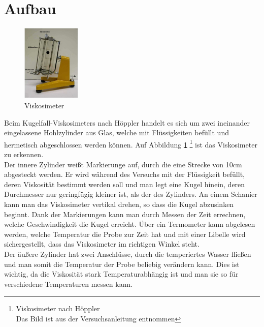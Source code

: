 	\section{Aufbau}
\begin{figure}
	\includegraphics[width=0.25\textwidth]{pics/aufbau.jpg}
	\caption{Viskosimeter}
	\label{aufbau}
\end{figure}
Beim Kugelfall-Viskosimeters nach Höppler handelt es sich um zwei ineinander eingelassene Hohlzylinder aus Glas, welche mit Flüssigkeiten befüllt und hermetisch abgeschlossen werden können. Auf Abbildung \ref{aufbau} \footnote{Viskosimeter nach Höppler\\Das Bild ist aus der Versuchsanleitung entnommen} ist das Viskosimeter zu erkennen.\\
Der innere Zylinder weißt Markierunge auf, durch die eine Strecke von 10cm abgesteckt werden. Er wird während des Versuchs mit der Flüssigkeit befüllt, deren Viskosität bestimmt werden soll und man legt eine Kugel hinein, deren Durchmesser nur geringfügig kleiner ist, als der des Zylinders. An einem Schanier kann man das Viskosimeter vertikal drehen, so dass die Kugel abzusinken beginnt. Dank der Markierungen kann man durch Messen der Zeit errechnen, welche Geschwindigkeit die Kugel erreicht.
Über ein Termometer kann abgelesen werden, welche Temperatur die Probe zur Zeit hat und mit einer Libelle wird sichergestellt, dass das Viskosimeter im richtigen Winkel steht.\\
Der äußere Zylinder hat zwei Anschlüsse, durch die temperiertes Wasser fließen und man somit die Temperatur der Probe beliebig verändern kann. Dies ist wichtig, da die Viskosität stark Temperaturabhängig ist und man sie so für verschiedene Temperaturen messen kann. 
